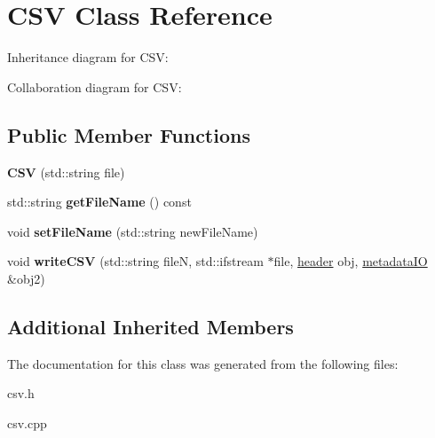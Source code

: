 \hypertarget{classCSV}{}\section{C\+SV Class Reference}
\label{classCSV}


Inheritance diagram for C\+SV\+:


Collaboration diagram for C\+SV\+:
\subsection*{Public Member Functions}
\begin{DoxyCompactItemize}
\item 
\mbox{\label{classCSV_a7d0db990fdf9369198682be4e00cb7bf}} 
{\bfseries C\+SV} (std\+::string file)
\item 
\mbox{\label{classCSV_a88f0561d7780c512dcc29818a201f0b8}} 
std\+::string {\bfseries get\+File\+Name} () const
\item 
\mbox{\label{classCSV_a66997666ec9af6aa37082dfd5be1334e}} 
void {\bfseries set\+File\+Name} (std\+::string new\+File\+Name)
\item 
\mbox{\label{classCSV_ac81f6766f96e7de9d0fd91985112e684}} 
void {\bfseries write\+C\+SV} (std\+::string fileN, std\+::ifstream $\ast$file, \hyperlink{classheader}{header} obj, \hyperlink{classmetadataIO}{metadata\+IO} \&obj2)
\end{DoxyCompactItemize}
\subsection*{Additional Inherited Members}


The documentation for this class was generated from the following files\+:\begin{DoxyCompactItemize}
\item 
csv.\+h\item 
csv.\+cpp\end{DoxyCompactItemize}
